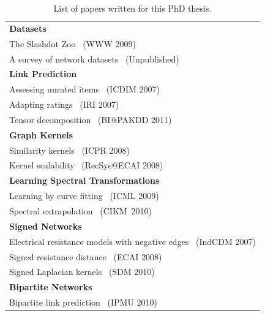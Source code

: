 \documentclass[11pt,a4paper]{book}
\begin{document}
\begin{table}[h!]
  \centering
  \caption{List of papers written for this PhD thesis.}
  \begin{tabular}{l}

  \toprule
    \textbf{Datasets} \\
    \qquad The Slashdot Zoo~\cite{kunegis:slashdot-zoo} (WWW 2009) \\
    \qquad A survey of network datasets~\cite{kunegis:network-survey} (Unpublished) \\
    \midrule
    \textbf{Link Prediction} \\
    \qquad Assessing unrated items~\cite{kunegis:assessing-unrated} (ICDIM 2007) \\ 
    \qquad Adapting ratings~\cite{kunegis:adapting-ratings} (IRI 2007)
    \\ 
    \qquad Tensor decomposition~\cite{spiegel:time-tensor} (BI@PAKDD
    2011) \\
    \midrule
    \textbf{Graph Kernels} \\
    \qquad Similarity kernels~\cite{kunegis:alternative-similarity} (ICPR 2008) \\
    \qquad Kernel scalability~\cite{kunegis:kernel-scalability} (RecSys@ECAI 2008) \\
    \midrule
    \textbf{Learning Spectral Transformations} \\
    \qquad Learning by curve fitting~\cite{kunegis:spectral-transformation} (ICML 2009) \\  
    \qquad Spectral extrapolation~\cite{kunegis:spectral-network-evolution} (CIKM~2010) \\ 
    \midrule
    \textbf{Signed Networks} \\
    \qquad Electrical resistance models with negative
    edges~\cite{kunegis:negative-resistance}  
    (IndCDM 2007)\\
    \qquad Signed resistance distance~\cite{kunegis:netflix-srd} 
    (ECAI 2008)\\
    \qquad Signed Laplacian kernels~\cite{kunegis:signed-kernels} 
    (SDM 2010)\\
    \midrule
    \textbf{Bipartite Networks} \\
    \qquad Bipartite link prediction~\cite{kunegis:hyperbolic-sine}
    (IPMU 2010) \\
    \bottomrule

    \end{tabular}
  \label{tab:contributions}
\end{table}
\end{document}

